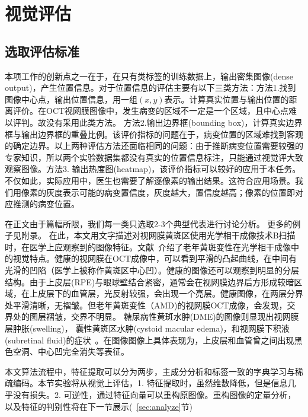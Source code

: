 \section{视觉评估}
    \label{sec:visualize}
    \subsection{选取评估标准}
    本项工作的创新点之一在于，在只有类标签的训练数据上，输出密集图像(dense output)，产生位置信息。对于位置信息的评估主要有以下三类方法：方法1.找到图像中心点，输出位置信息，用一组$(x, y)$表示。计算真实位置与输出位置的距离评价。在OCT视网膜图像中，发生病变的区域不一定是一个区域，且中心点难以评判。故没有采用此类方法。 方法2.输出边界框(bounding box)，计算真实边界框与输出边界框的重叠比例。该评价指标的问题在于，病变位置的区域难找到客观的确定边界。以上两种评估方法还面临相同的问题：由于推断病变位置需要较强的专家知识，所以两个实验数据集都没有真实的位置信息标注，只能通过视觉评大致观察图像。方法3. 输出热度图(heatmap)，该评价指标可以较好的应用于本任务。不仅如此，实际应用中，医生也需要了解逐像素的输出结果。这符合应用场景。我们用像素的灰度表示可能的病变置信度，灰度越大，置信度越高；像素的位置即对应推测的病变位置。


    在正文由于篇幅所限，我们每一类只选取2-3个典型代表进行讨论分析。 更多的例子见附录。
    在此，本文用文字描述对视网膜黄斑区使用光学相干成像技术B扫描时，在医学上应观察到的图像特征。文献~介绍了老年黄斑变性在光学相干成像中的视觉特点。健康的视网膜在OCT成像中，可以看到平滑的凸起曲线，在中间有光滑的凹陷（医学上被称作黄斑区中心凹）。健康的图像还可以观察到明显的分层结构。由于上皮层(RPE)与眼球壁结合紧密，通常会在视网膜边界后方形成较暗区域，在上皮层下的血管层，光反射较强，会出现一个亮层。健康图像，在两层分界处平滑清晰，无褶皱。但老年黄斑变性（AMD)的视网膜OCT成像，会发现，交界处的图层褶皱，交界不明显。 糖尿病性黄斑水肿(DME)的图像则显现出视网膜层肿胀(swelling)， 囊性黄斑区水肿(cystoid macular edema)，和视网膜下积液(subretinal fluid)的症状~\cite{bhagat2009diabetic}。在图像图像上具体表现为，上皮层和血管曾之间出现黑色空洞、中心凹完全消失等表征。


    本文算法流程中，特征提取可以分为两步，主成分分析和标签一致的字典学习与稀疏编码。本节实验将从视觉上评估，1. 特征提取时，虽然维数降低，但是信息几乎没有损失。2. 可逆性，通过特征向量可以重构原图像。重构图像的定量分析，以及特征的判别性将在下一节展示(~\ref{sec:analyze}节)



